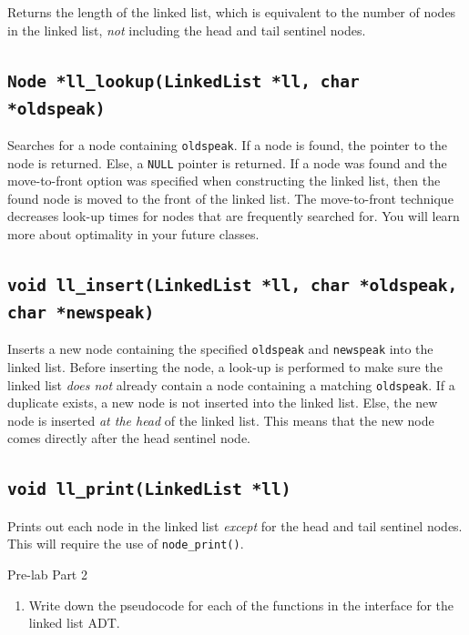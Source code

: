 \documentclass{article}
\begin{document}
Returns the length of the linked list, which is equivalent to the number
of nodes in the linked list, \emph{not} including the head and tail
sentinel nodes.

\subsection{\texttt{Node *ll\_lookup(LinkedList *ll, char
*oldspeak)}}

Searches for a node containing \texttt{oldspeak}. If a node is found,
the pointer to the node is returned. Else, a \texttt{NULL} pointer is
returned. If a node was found and the move-to-front option was specified
when constructing the linked list, then the found node is moved to the
front of the linked list. The move-to-front technique decreases look-up
times for nodes that are frequently searched for. You will learn more
about optimality in your future classes.

\subsection{\texttt{void ll\_insert(LinkedList *ll, char *oldspeak,
char *newspeak)}}

Inserts a new node containing the specified \texttt{oldspeak} and
\texttt{newspeak} into the linked list. Before inserting the node, a
look-up is performed to make sure the linked list \emph{does not} already
contain a node containing a matching \texttt{oldspeak}. If a duplicate
exists, a new node is not inserted into the linked list. Else, the new
node is inserted \emph{at the head} of the linked list. This means
that the new node comes directly after the head sentinel node.

\subsection{\texttt{void ll\_print(LinkedList *ll)}}

Prints out each node in the linked list \emph{except} for the head and
tail sentinel nodes. This will require the use of
\texttt{node\_print()}.

\vspace{10pt}
\begin{prelab}{Pre-lab Part 2}
  \begin{enumerate}
    \item Write down the pseudocode for each of the functions in the
      interface for the linked list ADT.
  \end{enumerate}
\end{prelab}
\end{document}
